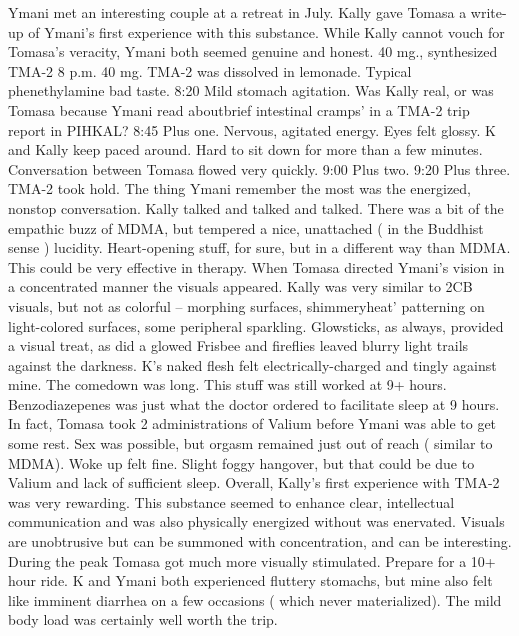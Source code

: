 \documentclass[12pt]{book}
\begin{document}
Ymani met an interesting couple at a retreat in July. Kally gave Tomasa a write-up of Ymani's first experience with this substance. While Kally cannot vouch for Tomasa's veracity, Ymani both seemed genuine and honest. 40 mg., synthesized TMA-2 8 p.m. 40 mg. TMA-2 was dissolved in lemonade. Typical phenethylamine bad taste. 8:20 Mild stomach agitation. Was Kally real, or was Tomasa because Ymani read aboutbrief intestinal cramps' in a TMA-2 trip report in PIHKAL? 8:45 Plus one. Nervous, agitated energy. Eyes felt glossy. K and Kally keep paced around. Hard to sit down for more than a few minutes. Conversation between Tomasa flowed very quickly. 9:00 Plus two. 9:20 Plus three. TMA-2 took hold. The thing Ymani remember the most was the energized, nonstop conversation. Kally talked and talked and talked. There was a bit of the empathic buzz of MDMA, but tempered a nice, unattached ( in the Buddhist sense ) lucidity. Heart-opening stuff, for sure, but in a different way than MDMA. This could be very effective in therapy. When Tomasa directed Ymani's vision in a concentrated manner the visuals appeared. Kally was very similar to 2CB visuals, but not as colorful -- morphing surfaces, shimmeryheat' patterning on light-colored surfaces, some peripheral sparkling. Glowsticks, as always, provided a visual treat, as did a glowed Frisbee and fireflies leaved blurry light trails against the darkness. K's naked flesh felt electrically-charged and tingly against mine. The comedown was long. This stuff was still worked at 9+ hours. Benzodiazepenes was just what the doctor ordered to facilitate sleep at 9 hours. In fact, Tomasa took 2 administrations of Valium before Ymani was able to get some rest. Sex was possible, but orgasm remained just out of reach ( similar to MDMA). Woke up felt fine. Slight foggy hangover, but that could be due to Valium and lack of sufficient sleep. Overall, Kally's first experience with TMA-2 was very rewarding. This substance seemed to enhance clear, intellectual communication and was also physically energized without was enervated. Visuals are unobtrusive but can be summoned with concentration, and can be interesting. During the peak Tomasa got much more visually stimulated. Prepare for a 10+ hour ride. K and Ymani both experienced fluttery stomachs, but mine also felt like imminent diarrhea on a few occasions ( which never materialized). The mild body load was certainly well worth the trip.
\end{document}
